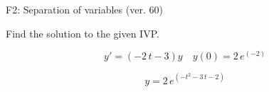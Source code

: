 \begin{exercise}
  \begin{exerciseTitle}F2: Separation of variables (ver. 60)\end{exerciseTitle}
  \begin{exerciseStatement}
    
Find the solution to the given IVP.

    
\[y'=( -2 \, t - 3 )y\hspace{1em} y(0)= 2 \, e^{\left(-2\right)}\]

  \end{exerciseStatement}
  \begin{exerciseAnswer}
    
\[y= 2 \, e^{\left(-t^{2} - 3 \, t - 2\right)}\]

  \end{exerciseAnswer}
\end{exercise}